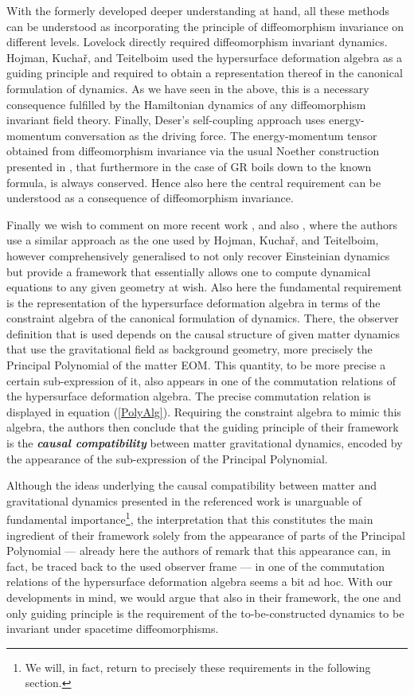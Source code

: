 With the formerly developed deeper understanding at hand, all these methods can be understood as incorporating the principle of diffeomorphism invariance on different levels. Lovelock directly required diffeomorphism invariant dynamics. Hojman, Kuchař, and Teitelboim used the hypersurface deformation algebra as a guiding principle and required to obtain a representation thereof in the canonical formulation of dynamics. As we have seen in the above, this is a necessary consequence fulfilled by the Hamiltonian dynamics of any diffeomorphism invariant field theory. Finally, Deser's self-coupling approach uses energy-momentum conversation as the driving force. The energy-momentum tensor obtained from diffeomorphism invariance via the usual Noether construction presented in \cite{Gotay1992StressEnergyMomentumTA}, that furthermore in the case of GR boils down to the known formula, is always conserved. Hence also here the central requirement can be understood as a consequence of diffeomorphism invariance. 

Finally we wish to comment on more recent work \cite{2018PhRvD..97h4036D}, \cite{2012PhRvD..85j4042G} and also \cite{2017arXiv170803870S}, where the authors use a similar approach as the one used by Hojman, Kuchař, and Teitelboim, however comprehensively generalised to not only recover Einsteinian dynamics but provide a framework that essentially allows one to compute dynamical equations to any given geometry at wish. Also here the fundamental requirement is the representation of the hypersurface deformation algebra in terms of the constraint algebra of the canonical formulation of dynamics. There, the observer definition that is used depends on the causal structure of given matter dynamics that use the gravitational field as background geometry, more precisely the Principal Polynomial of the matter EOM. This quantity, to be more precise a certain sub-expression of it, also appears in one of the commutation relations of the hypersurface deformation algebra. The precise commutation relation is displayed in equation (\ref{PolyAlg}).   Requiring the constraint algebra to mimic this algebra, the authors then conclude that the guiding principle of their framework is the \textit{\textbf{causal compatibility}} between matter gravitational dynamics, encoded by the appearance of the sub-expression of the Principal Polynomial.

Although the ideas underlying the causal compatibility between matter and gravitational dynamics presented in the referenced work is unarguable of fundamental importance\footnote{We will, in fact, return to precisely these requirements in the following section.}, the interpretation that this constitutes the main ingredient of their framework solely from the appearance of parts of the Principal Polynomial --- already here the authors of \cite{2018PhRvD..97h4036D} remark that this appearance can, in fact, be traced back to the used observer frame --- in one of the commutation relations of the hypersurface deformation algebra seems a bit ad hoc.
With our developments in mind, we would argue that also in their framework, the one and only guiding principle is the requirement of the to-be-constructed dynamics to be invariant under spacetime diffeomorphisms.
